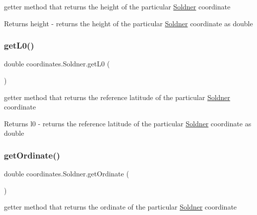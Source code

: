 getter method that returns the height of the particular \hyperlink{classcoordinates_1_1_soldner}{Soldner} coordinate 

\begin{DoxyReturn}{Returns}
height -\/ returns the height of the particular \hyperlink{classcoordinates_1_1_soldner}{Soldner} coordinate as double 
\end{DoxyReturn}
\mbox{\label{classcoordinates_1_1_soldner_a58e4fa59465e0953f6302ea668f2d270}} 
\subsubsection{\texorpdfstring{get\+L0()}{getL0()}}
{\footnotesize\ttfamily double coordinates.\+Soldner.\+get\+L0 (\begin{DoxyParamCaption}{ }\end{DoxyParamCaption})}



getter method that returns the reference latitude of the particular \hyperlink{classcoordinates_1_1_soldner}{Soldner} coordinate 

\begin{DoxyReturn}{Returns}
l0 -\/ returns the reference latitude of the particular \hyperlink{classcoordinates_1_1_soldner}{Soldner} coordinate as double 
\end{DoxyReturn}
\mbox{\label{classcoordinates_1_1_soldner_abb044e1be4724e6cd0ee72083a6245d0}} 
\subsubsection{\texorpdfstring{get\+Ordinate()}{getOrdinate()}}
{\footnotesize\ttfamily double coordinates.\+Soldner.\+get\+Ordinate (\begin{DoxyParamCaption}{ }\end{DoxyParamCaption})}



getter method that returns the ordinate of the particular \hyperlink{classcoordinates_1_1_soldner}{Soldner} coordinate 


